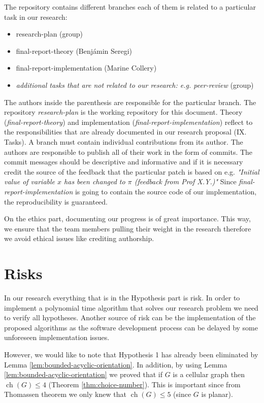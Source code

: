 \documentclass[letterpaper, 10 pt, conference]{ieeeconf}  %
\DeclareMathOperator*{\ch}{ch}
\begin{document}
The repository contains different branches each of them is related to a particular task in our research:
\begin{itemize}
\item research-plan (group)
\item final-report-theory (Benjámin Seregi)
\item final-report-implementation (Marine Collery)
\item \textit{additional tasks that are not related to our research: e.g. peer-review} (group)
\end{itemize}
The authors inside the parenthesis are responsible for the particular branch. The repository \textit{research-plan} is the working repository for this document. Theory (\textit{final-report-theory}) and implementation (\textit{final-report-implementation}) reflect to the responsibilities that are already documented in our research proposal (IX. Tasks).
A branch must contain individual contributions from its author. The authors are responsible to publish all of their work in the form of commits. The commit messages should be descriptive and informative and if it is necessary credit the source of the feedback that the particular patch is based on e.g. \textit{"Initial value of variable $x$ has been changed to $\pi$ (feedback from Prof X.Y.)"}
Since \textit{final-report-implementation} is going to contain the source code of our implementation, the reproducibility is guaranteed.

On the ethics part, documenting our progress is of great importance. This way, we ensure that the team members pulling their weight in the research therefore we avoid ethical issues like crediting authorship.


\section{Risks}
In our research everything that is in the Hypothesis part is risk. In order to implement a polynomial time algorithm that solves our research problem we need to verify all hypotheses. Another source of risk can be the implementation of the proposed algorithms as the software development process can be delayed by some unforeseen implementation issues.

However, we would like to note that Hypothesis 1 has already been eliminated by Lemma \ref{lem:bounded-acyclic-orientation}. In addition, by using Lemma \ref{lem:bounded-acyclic-orientation} we proved that if $G$ is a cellular graph then $\ch(G) \leqslant 4$ (Theorem \ref{thm:choice-number}). This is important since from Thomassen theorem \cite{Thomassen:1994:PG:184180.184192} we only knew that $\ch(G) \leqslant 5$ (since $G$ is planar).
\end{document}
